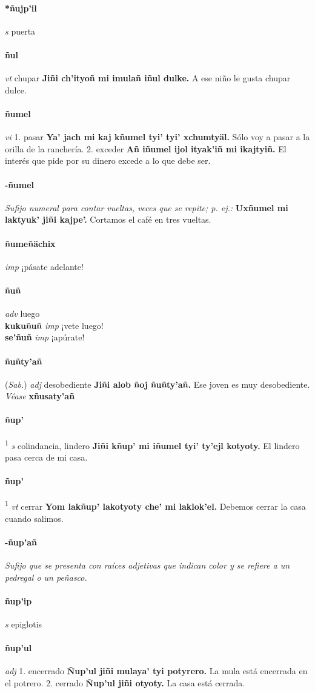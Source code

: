 \documentclass{scrbook}
\newcommand{\entry}[1]{\paragraph{#1}}
\newcommand{\onedefinition}[1]{#1.}
\newcommand{\defsuperscript}[1]{\textsuperscript{1}}
\newcommand{\nontranslationdef}[1]{\textit{#1}}
\newcommand{\partofspeech}[1]{\textit{#1}}
\newcommand{\spanishtranslation}[1]{#1}
\newcommand{\cholexample}[1]{\textbf{#1}}
\newcommand{\exampletranslation}[1]{#1}
\newcommand{\alsosee}[1]{\\\textit{Véase} \textbf{#1}}
\newcommand{\relevantdialect}[1]{(\textit{#1})}
\newcommand{\secondaryentry}[1]{\\\textbf{#1}}
\newcommand{\secondpartofspeech}[1]{\textit{#1}}
\newcommand{\secondtranslation}[1]{#1}
\begin{document}
\begin{multicols}{2}
\entry{*ñujp'il}
\partofspeech{s}
\spanishtranslation{puerta}

\entry{ñul}
\partofspeech{vt}
\spanishtranslation{chupar}
\cholexample{Jiñi ch'ityoñ mi imulañ iñul dulke.}
\exampletranslation{A ese niño le gusta chupar dulce.}

\entry{ñumel}
\partofspeech{vi}
\onedefinition{1}
\spanishtranslation{pasar}
\cholexample{Ya' jach mi kaj kñumel tyi' tyi' xchumtyäl.}
\exampletranslation{Sólo voy a pasar a la orilla de la ranchería.}
\onedefinition{2}
\spanishtranslation{exceder}
\cholexample{Añ iñumel ijol ityak'iñ mi ikajtyiñ.}
\exampletranslation{El interés que pide por su dinero excede a lo que debe ser.}

\entry{-ñumel}
\nontranslationdef{Sufijo numeral para contar vueltas, veces que se repite; p. ej.:}
\cholexample{Uxñumel mi laktyuk' jiñi kajpe'.}
\exampletranslation{Cortamos el café en tres vueltas.}

\entry{ñumeñächix}
\partofspeech{imp}
\spanishtranslation{¡pásate adelante!}

\entry{ñuñ}
\partofspeech{adv}
\spanishtranslation{luego}
\secondaryentry{kukuñuñ}
\secondpartofspeech{imp}
\secondtranslation{¡vete luego!}
\secondaryentry{se'ñuñ}
\secondpartofspeech{imp}
\secondtranslation{¡apúrate!}

\entry{ñuñty'añ}
\relevantdialect{Sab.}
\partofspeech{adj}
\spanishtranslation{desobediente}
\cholexample{Jiñi alob ñoj ñuñty'añ.}
\exampletranslation{Ese joven es muy desobediente.}
\alsosee{xñusaty'añ}

\entry{ñup'}
\defsuperscript{1}
\partofspeech{s}
\spanishtranslation{colindancia, lindero}
\cholexample{Jiñi kñup' mi iñumel tyi' ty'ejl kotyoty.}
\exampletranslation{El lindero pasa cerca de mi casa.}

\entry{ñup'}
\defsuperscript{2}
\partofspeech{vt}
\spanishtranslation{cerrar}
\cholexample{Yom lakñup' lakotyoty che' mi laklok'el.}
\exampletranslation{Debemos cerrar la casa cuando salimos.}

\entry{-ñup'añ}
\nontranslationdef{Sufijo que se presenta con raíces adjetivas que indican color y se refiere a un pedregal o un peñasco.}

\entry{ñup'ip}
\partofspeech{s}
\spanishtranslation{epiglotis}

\entry{ñup'ul}
\partofspeech{adj}
\onedefinition{1}
\spanishtranslation{encerrado}
\cholexample{Ñup'ul jiñi mulaya' tyi potyrero.}
\exampletranslation{La mula está encerrada en el potrero.}
\onedefinition{2}
\spanishtranslation{cerrado}
\cholexample{Ñup'ul jiñi otyoty.}
\exampletranslation{La casa está cerrada.}


\end{multicols}
\end{document}
